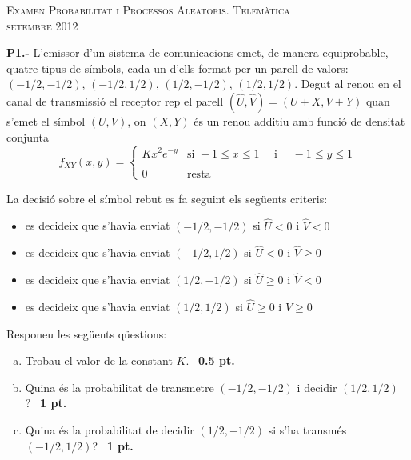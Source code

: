 \documentclass{report}
\begin{document}
\begin{center}
\textsc{Examen Probabilitat i Processos Aleatoris.
Telem\`{a}tica\\
setembre 2012}
\end{center}

\vspace{0.5 cm}
\noindent\textbf{P1.-}
L'emissor d'un sistema de comunicacions emet, de manera equiprobable, quatre
tipus de s\'imbols, cada un d'ells format per un parell de valors:
$(-1/2, -1/2)$, $(-1/2, 1/2)$, $(1/2, -1/2)$, $(1/2, 1/2)$. Degut al renou en el canal de
transmissi\'o el receptor rep el parell $(\hat{U}, \hat{V})=(U+X, V+Y)$ quan
s'emet el s\'imbol $(U, V)$, on $(X, Y)$ \'es un renou additiu amb funci\'o de
densitat conjunta
\[
f_{XY}(x, y)=\begin{cases}
K x^2 e^{-y} & \text{si } -1 \leq x \leq 1 \quad \text{ i } \quad -1 \leq y \leq 1 \\ \\
0 & \text{resta}
\end{cases}
\]

La decisi\'o sobre el s\'imbol rebut es fa seguint els seg\"uents criteris:
\begin{itemize}
\item es decideix que s'havia enviat $(-1/2, -1/2)$ si $\hat{U} < 0$ i $\hat{V} < 0$
\item es decideix que s'havia enviat $(-1/2, 1/2)$ si $\hat{U} < 0$ i $\hat{V} \geq 0$
\item es decideix que s'havia enviat $(1/2, -1/2)$ si $\hat{U} \geq 0$ i $\hat{V} < 0$
\item es decideix que s'havia enviat $(1/2, 1/2)$ si $\hat{U} \geq 0$ i $\hat{V} \geq 0$
\end{itemize}

Responeu les seg\"uents q\"uestions:
\begin{enumerate}[a)]
\item Trobau el valor de la constant $K$.\ \hfill{\textbf{ 0.5 pt.}}
\item Quina \'es la probabilitat de transmetre $(-1/2, -1/2)$ i decidir $(1/2, 1/2)$?\ \hfill{\textbf{ 1 pt.}}
\item Quina \'es la probabilitat de decidir $(1/2, -1/2)$ si s'ha transm\'es $(-1/2, 1/2)$?\ \hfill{\textbf{ 1 pt.}}
\end{enumerate}


\vspace{0.5 cm}
\end{document}
